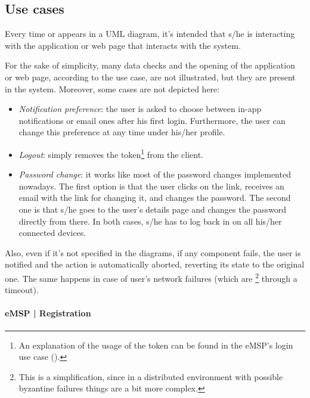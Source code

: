 \subsection{Use cases}

Every time  or  appears in a UML diagram, it's intended that s/he is interacting with the application or web page that interacts with the system.\medskip

For the sake of simplicity, many data checks and the opening of the application or web page, according to the use case, are not illustrated, but they are present in the system. Moreover, some cases are not depicted here:
\begin{itemize}
    \item \textit{Notification preference}: the user is asked to choose between in-app notifications or email ones after his first login. Furthermore, the user can change this preference at any time under his/her profile.
    \item \textit{Logout}: simply removes the token\footnote{An explanation of the usage of the token can be found in the eMSP's login use case ().} from the client.
    \item \textit{Password change}: it works like most of the password changes implemented nowadays. The first option is that the user clicks on the  link, receives an email with the link for changing it, and changes the password. The second one is that s/he goes to the user's details page and changes the password directly from there. In both cases, s/he has to log back in on all his/her connected devices.
\end{itemize}
Also, even if it's not specified in the diagrams, if any component fails, the user is notified and the action is automatically aborted, reverting its state to the original one. The same happens in case of user's network failures (which are \footnote{This is a simplification, since in a distributed environment with possible byzantine failures things are a bit more complex.} through a timeout).

\vfill
\pagebreak

\paragraph{eMSP | Registration}

